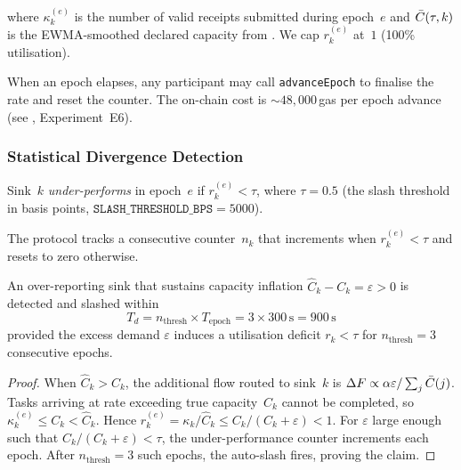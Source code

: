 \noindent where $\kappa_k^{(e)}$ is the number of valid receipts submitted
during epoch~$e$ and $\bar{C}(\tau, k)$ is the EWMA-smoothed declared
capacity from .  We cap $r_k^{(e)}$ at~$1$ (100\% utilisation).

When an epoch elapses, any participant may call \texttt{advanceEpoch} to
finalise the rate and reset the counter.  The on-chain cost is
${\sim}48{,}000$\,gas per epoch advance (see ,
Experiment~E6).

\subsubsection{Statistical Divergence Detection}
\label{sec:divergence}

\begin{definition}
\label{def:underperform}
Sink~$k$ \emph{under-performs} in epoch~$e$ if
$r_k^{(e)} < \tau$, where $\tau = 0.5$ (the slash threshold in basis points,
$\mathtt{SLASH\_THRESHOLD\_BPS} = 5000$).
\end{definition}

The protocol tracks a consecutive counter~$n_k$ that increments when
$r_k^{(e)} < \tau$ and resets to zero otherwise.

\begin{proposition}
\label{prop:detection-latency}
An over-reporting sink that sustains capacity inflation
$\hat{C}_k - C_k = \varepsilon > 0$ is detected and slashed within
\begin{equation}
\label{eq:detection-time}
T_d = n_{\mathrm{thresh}} \times T_{\mathrm{epoch}} = 3 \times 300\,\text{s}
     = 900\,\text{s}
\end{equation}
provided the excess demand $\varepsilon$ induces a utilisation deficit
$r_k < \tau$ for $n_{\mathrm{thresh}} = 3$ consecutive epochs.
\end{proposition}

\begin{proof}
When $\hat{C}_k > C_k$, the additional flow routed to sink~$k$ is
$\Delta F \propto \alpha \varepsilon / \sum_j \bar{C}(j)$.  Tasks arriving
at rate exceeding true capacity~$C_k$ cannot be completed, so
$\kappa_k^{(e)} \leq C_k < \hat{C}_k$.  Hence
$r_k^{(e)} = \kappa_k / \hat{C}_k \leq C_k / (C_k + \varepsilon) < 1$.
For $\varepsilon$ large enough such that $C_k / (C_k + \varepsilon) < \tau$,
the under-performance counter increments each epoch.  After
$n_{\mathrm{thresh}} = 3$ such epochs, the auto-slash fires, proving the
claim.
\end{proof}

